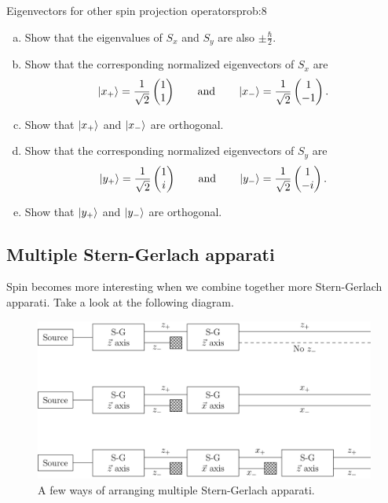 \documentclass{article}
\begin{document}
\begin{problem}{Eigenvectors for other spin projection operators}{prob:8}
    \begin{enumerate}[(a)]
        \item Show that the eigenvalues of $S_x$ and $S_y$ are also $\pm\frac{\hbar}{2}$.
        \item Show that the corresponding normalized eigenvectors of $S_x$ are
        \[
        \ket{x_+} = \frac{1}{\sqrt{2}} \begin{pmatrix} 1 \\ 1 \end{pmatrix} \qquad \textrm{and} \qquad \ket{x_-} = \frac{1}{\sqrt{2}} \begin{pmatrix} 1 \\ -1 \end{pmatrix}.
        \]
        \item Show that $\ket{x_+}$ and $\ket{x_-}$ are orthogonal.
        \item Show that the corresponding normalized eigenvectors of $S_y$ are
        \[
        \ket{y_+} = \frac{1}{\sqrt{2}} \begin{pmatrix} 1 \\ i \end{pmatrix} \qquad \textrm{and} \qquad \ket{y_-} = \frac{1}{\sqrt{2}} \begin{pmatrix} 1 \\ -i \end{pmatrix}.
        \]
        \item Show that $\ket{y_+}$ and $\ket{y_-}$ are orthogonal.
    \end{enumerate}
\end{problem}

\subsection{Multiple Stern-Gerlach apparati}

Spin becomes more interesting when we combine together more Stern-Gerlach apparati. Take a look at the following diagram.

\begin{figure}[H]
    \centering
    \includegraphics[width=.8\textwidth]{multiple_stern_gerlach.png}
    \caption{A few ways of arranging multiple Stern-Gerlach apparati.}
\end{figure}
\end{document}

